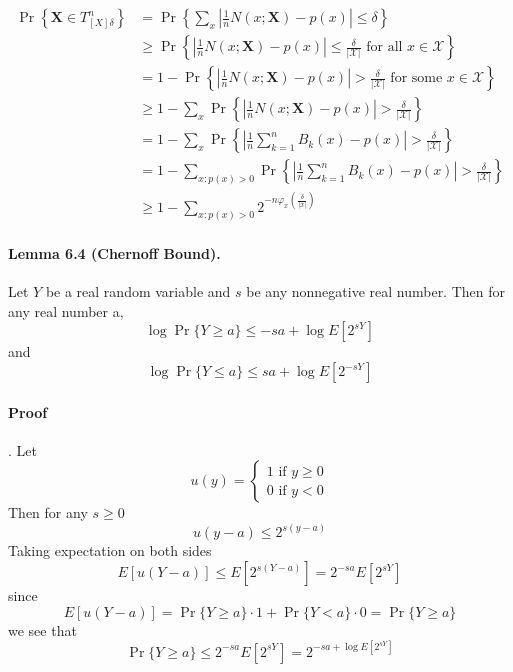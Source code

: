 \documentclass[8pt]{article}
\begin{document}
\begin{enumerate}
$$
\begin{aligned}
	\operatorname{Pr}\left\{\mathbf{X} \in T_{[X] \delta}^{n}\right\} 
	&=\operatorname{Pr}\left\{\sum_{x}\left|\frac{1}{n} N(x ; \mathbf{X})-p(x)\right| \leq \delta\right\} \\
	&\geq \operatorname{Pr}\left\{\left|\frac{1}{n} N(x ; \mathbf{X})-p(x)\right| \leq \frac{\delta}{|\mathcal{X}|} \text { for all } x \in \mathcal{X}\right\} \\
	&=1-\operatorname{Pr}\left\{\left|\frac{1}{n} N(x ; \mathbf{X})-p(x)\right|>\frac{\delta}{|\mathcal{X}|} \text { for some } x \in \mathcal{X}\right\} \\
	&\geq 1-\sum_{x} \operatorname{Pr}\left\{\left|\frac{1}{n} N(x ; \mathbf{X})-p(x)\right|>\frac{\delta}{|\mathcal{X}|}\right\} \\
	&= 1-\sum_{x} \operatorname{Pr}\left\{\left|\frac{1}{n} \sum_{k=1}^{n} B_{k}(x)-p(x)\right|>\frac{\delta}{|\mathcal{X}|}\right\} \\
	&= 1-\sum_{x: p(x)>0} \operatorname{Pr}\left\{\left|\frac{1}{n} \sum_{k=1}^{n} B_{k}(x)-p(x)\right|>\frac{\delta}{|\mathcal{X}|}\right\} \\
	&\geq 1-\sum_{x: p(x)>0} 2^{-n \varphi_{x}\left(\frac{\delta}{|x|}\right)}
\end{aligned}
$$

\begin{tcolorbox}
\paragraph{Lemma 6.4 (Chernoff Bound).} Let $Y$ be a real random variable and $s$ be any nonnegative real number. Then for any real number a,
$$
\log \operatorname{Pr}\{Y \geq a\} \leq-s a+\log E\left[2^{s Y}\right]
$$
and
$$
\log \operatorname{Pr}\{Y \leq a\} \leq s a+\log E\left[2^{-s Y}\right]
$$
\end{tcolorbox}
\paragraph{Proof}. Let
$$
u(y)=\left\{\begin{array}{l}
	1 \text { if } y \geq 0 \\
	0 \text { if } y<0
\end{array}\right.
$$
Then for any $s \geq 0$
$$
u(y-a) \leq 2^{s(y-a)}
$$
Taking expectation on both sides
$$
E[u(Y-a)] \leq E\left[2^{s(Y-a)}\right]=2^{-s a} E\left[2^{s Y}\right]
$$
since
$$
E[u(Y-a)]=\operatorname{Pr}\{Y \geq a\} \cdot 1+\operatorname{Pr}\{Y<a\} \cdot 0=\operatorname{Pr}\{Y \geq a\}
$$
we see that
$$
\operatorname{Pr}\{Y \geq a\} \leq 2^{-s a} E\left[2^{s Y}\right]=2^{-s a+\log E\left[2^{s Y}\right]}
$$

\end{enumerate}
\end{document}
